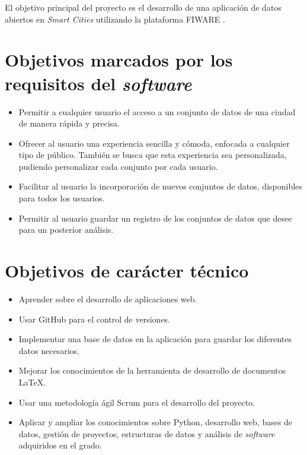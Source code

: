 \begin{comment}
Este apartado explica de forma precisa y concisa cuales son los objetivos que se persiguen con la realización del proyecto. Se puede distinguir entre los objetivos marcados por los requisitos del software a construir y los objetivos de carácter técnico que plantea a la hora de llevar a la práctica el proyecto.
\end{comment}

El objetivo principal del proyecto es el desarrollo de una aplicación de datos abiertos en \textit{Smart Cities} utilizando la plataforma FIWARE \cite{fiware}. 

\section{Objetivos marcados por los requisitos del \textit{software}}\label{objetivos-generales}

\begin{itemize}
\tightlist
\item
  Permitir a cualquier usuario el acceso a un conjunto de datos de una ciudad de manera rápida y precisa.
\item
  Ofrecer al usuario una experiencia sencilla y cómoda, enfocada a cualquier tipo de público. También se busca que esta experiencia sea personalizada, pudiendo personalizar cada conjunto por cada usuario.
\item
  Facilitar al usuario la incorporación de nuevos conjuntos de datos, disponibles para todos los usuarios.
\item
  Permitir al usuario guardar un registro de los conjuntos de datos que desee para un posterior análisis.
\end{itemize}



\section{Objetivos de carácter técnico}\label{objetivos-personales}

\begin{itemize}
\tightlist

\item Aprender sobre el desarrollo de aplicaciones web.
\item Usar GitHub para el control de versiones.
\item Implementar una base de datos en la aplicación para guardar los diferentes datos necesarios.
\item Mejorar los conocimientos de la herramienta de desarrollo de documentos \LaTeX{}.
\item Usar una metodología ágil Scrum para el desarrollo del proyecto.
\item Aplicar y ampliar los conocimientos sobre Python, desarrollo web, bases de datos, gestión de proyectos, estructuras de datos y análisis de \textit{software} adquiridos en el grado.


\end{itemize}